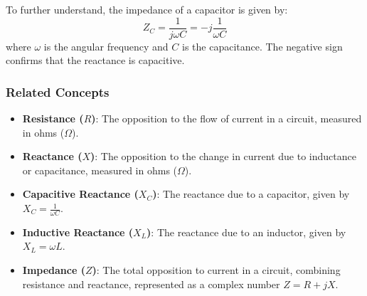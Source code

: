 To further understand, the impedance of a capacitor is given by:
\[
Z_C = \frac{1}{j\omega C} = -j\frac{1}{\omega C}
\]
where \(\omega\) is the angular frequency and \(C\) is the capacitance. The negative sign confirms that the reactance is capacitive.

\subsubsection{Related Concepts}
\begin{itemize}
    \item \textbf{Resistance (\(R\))}: The opposition to the flow of current in a circuit, measured in ohms (\(\Omega\)).
    \item \textbf{Reactance (\(X\))}: The opposition to the change in current due to inductance or capacitance, measured in ohms (\(\Omega\)).
    \item \textbf{Capacitive Reactance (\(X_C\))}: The reactance due to a capacitor, given by \(X_C = \frac{1}{\omega C}\).
    \item \textbf{Inductive Reactance (\(X_L\))}: The reactance due to an inductor, given by \(X_L = \omega L\).
    \item \textbf{Impedance (\(Z\))}: The total opposition to current in a circuit, combining resistance and reactance, represented as a complex number \(Z = R + jX\).
\end{itemize}

